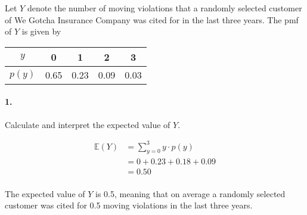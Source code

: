 


\renewcommand\assignment{Worksheet 10, Due Friday, February 10, 4:15pm}


    \iffalse
    \begin{equation*}
        \begin{gathered}
            Equations go here.
        \end{gathered}
    \end{equation*}

    \resizebox{\hsize}{!}{$Long equation goes here$}

    \begin{multicol*}{# of columns}
    \end{multicol*}

    \horizontal

    \fi


    Let $Y$ denote the number of moving violations that a randomly selected customer of We Gotcha Insurance Company was cited for in the last three years. The pmf of $Y$ is given by

    \begin{center}
        \begin{tabular}{c | c c c c}
            $y$ & 0 & 1 & 2 & 3 \\
            \hline
            $p(y)$ & 0.65 & 0.23 & 0.09 & 0.03 
        \end{tabular}
    \end{center}

    \paragraph*{1.}
    Calculate and interpret the expected value of $Y$.

    \begin{mdframed}
        \begin{align*}
            \mathbb{E}(Y)   & = \sum_{y=0}^{3} y \cdot p(y)   \\
                            & = 0 + 0.23 + 0.18 + 0.09        \\
                            & = \boxed{0.50}                          \\
        \end{align*}

        The expected value of $Y$ is 0.5, meaning that on average a randomly selected customer was cited for 0.5 moving violations in the last three years.
    \end{mdframed}

